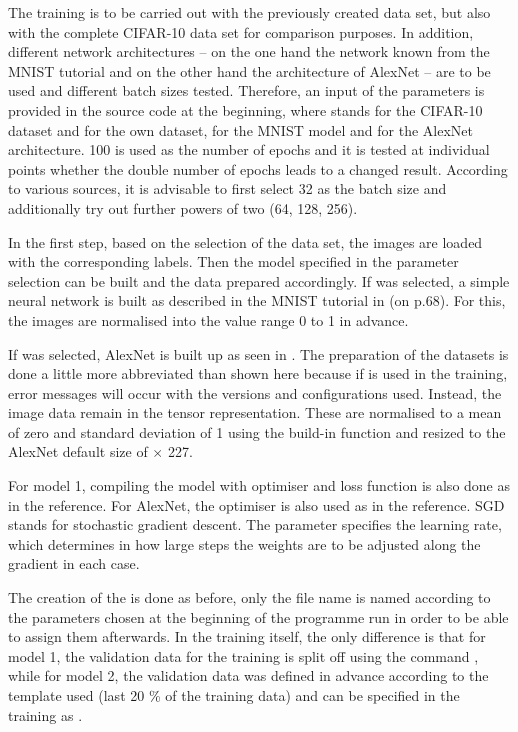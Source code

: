 The training is to be carried out with the previously created data set, but also with the complete CIFAR-10 data set for comparison purposes. In addition, different network architectures -- on the one hand the network known from the MNIST tutorial and on the other hand the architecture of AlexNet -- are to be used and different batch sizes tested. Therefore, an input of the parameters is provided in the source code at the beginning, where  stands for the CIFAR-10 dataset and  for the own dataset,  for the MNIST model and  for the AlexNet architecture. 100 is used as the number of epochs and it is tested at individual points whether the double number of epochs leads to a changed result. According to various sources, it is advisable to first select 32 as the batch size and additionally try out further powers of two (64, 128, 256).

In the first step, based on the selection of the data set, the images are loaded with the corresponding labels. Then the model specified in the parameter selection can be built and the data prepared accordingly. If  was selected, a simple neural network is built as described in the MNIST tutorial in \cite{Heise:2020} (on p.68). For this, the images are normalised into the value range 0 to 1 in advance.

If  was selected, AlexNet is built up as seen in \cite{Alake:2020}. The preparation of the datasets is done a little more abbreviated than shown here because if  is used in the training, error messages will occur with the versions and configurations used. Instead, the image data remain in the tensor representation. These are normalised to a mean of zero and standard deviation of 1 using the build-in function  and resized to the AlexNet default size of $\times$ 227.

For model 1, compiling the model with optimiser and loss function is also done as in the reference. For AlexNet, the optimiser  is also used as in the reference. SGD stands for \glqq stochastic gradient descent\grqq. The parameter  specifies the learning rate, which determines in how large steps the weights are to be adjusted along the gradient in each case.

The creation of the  is done as before, only the file name is named according to the parameters chosen at the beginning of the programme run in order to be able to assign them afterwards. In the training itself, the only difference is that for model 1, the validation data for the training is split off using the command , while for model 2, the validation data was defined in advance according to the template used (last 20 \% of the training data) and can be specified in the training as .

